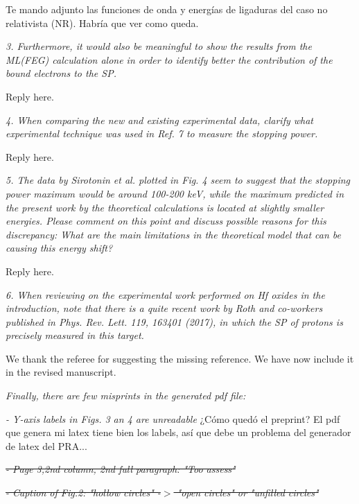 \documentclass[a4paper,10pt]{article}
\begin{document}
\vspace{0.1cm}
{\color{red}Te mando adjunto las funciones de onda y energías de ligaduras
del caso no relativista (NR). Habría que ver como queda.}

\vspace{0.25cm}
\textsl{
3. Furthermore, it would also be meaningful to show the results from
the ML(FEG) calculation alone in order to identify better the
contribution of the bound electrons to the SP.}

\vspace{0.1cm}
{\color{red}Reply here.}

\vspace{0.25cm}
\textsl{
4. When comparing the new and existing experimental data, clarify what
experimental technique was used in Ref. 7 to measure the stopping
power.}

\vspace{0.1cm}
{\color{red}Reply here.}

\vspace{0.25cm}
\textsl{
5. The data by Sirotonin et al. plotted in Fig. 4 seem to suggest that
the stopping power maximum would be around 100-200 keV, while the
maximum predicted in the present work by the theoretical calculations
is located at slightly smaller energies. Please comment on this point
and discuss possible reasons for this discrepancy: What are the main
limitations in the theoretical model that can be causing this energy
shift?}

\vspace{0.1cm}
{\color{red}Reply here.}

\vspace{0.25cm}
\textsl{
6. When reviewing on the experimental work performed on Hf oxides in
the introduction, note that there is a quite recent work by Roth and
co-workers published in Phys. Rev. Lett. 119, 163401 (2017), in which
the SP of protons is precisely measured in this target.}

\vspace{0.1cm}
We thank the referee for suggesting the missing reference. We have now
include it in the revised manuscript.

\vspace{0.25cm}
\textsl{Finally, there are few misprints in the generated pdf file:}

\textsl{- Y-axis labels in Figs. 3 an 4 are unreadable }
{\color{red} ¿Cómo quedó el preprint? El pdf que genera mi latex tiene 
bien los labels, así que debe un problema del generador de latex del PRA...}

\st{\textsl{- Page 3,2nd column, 2nd full paragraph: "Too assess"}}

\st{\textsl{- Caption of Fig.2: "hollow circles" -$>$ "open circles" or
"unfilled circles"}}
\end{document}

